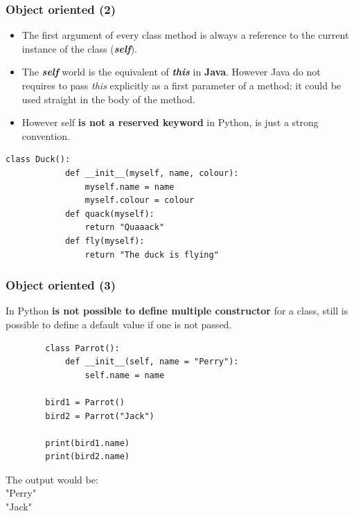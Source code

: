 \documentclass[xcolor ={table,usenames,dvipsnames}]{beamer}
\theoremstyle{definition}
\begin{document}
	\begin{frame}[fragile]
		\frametitle{Object oriented (2)}
		\begin{itemize}
			\item The first argument of every class method is always a reference to the current instance of the class (\textit{\textbf{self}}).
			\item The \textbf{\textit{self}} world is the equivalent of \textbf{\textit{this}} in \textbf{Java}. However Java do not requires to pass \textit{this} explicitly as a first parameter of a method: it could be used straight in the body of the method.
			\item However self\textbf{ is not a reserved keyword} in Python, is just a strong convention.
		\end{itemize}
		\begin{lstlisting}[basicstyle=\fontsize{2}{4}\selectfont\ttfamily\tiny]
		class Duck():
			def __init__(myself, name, colour):
				myself.name = name
				myself.colour = colour
			def quack(myself):
				return "Quaaack"	
			def fly(myself):
				return "The duck is flying"
		\end{lstlisting}
	\end{frame}

	\begin{frame}[fragile]
		\frametitle{Object oriented (3)}
		In Python \textbf{is not possible to define multiple constructor} for a class, still is possible to define a default value if one is not passed.
		
		\begin{lstlisting}
		class Parrot():
			def __init__(self, name = "Perry"):
				self.name = name
		
		bird1 = Parrot()
		bird2 = Parrot("Jack")
		
		print(bird1.name)
		print(bird2.name)
		\end{lstlisting}
		The output would be:\\
		"Perry"\\
		"Jack"
	\end{frame}

	
		
	
	

	
	
	
	
	
	
	
	
	
	
	
\end{document}
